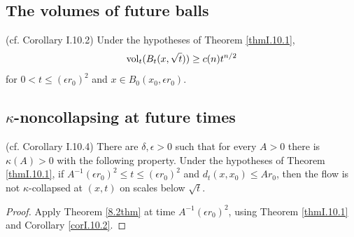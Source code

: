 \subsection{The volumes of future balls}
\begin{corollary}
  \label{cor:kl-volumes-future-balls-volume-corollary}
  (cf. Corollary I.10.2) \label{corI.10.2}
Under the hypotheses of Theorem \ref{thmI.10.1},
\begin{equation}\operatorname{vol}_t(B_t(x,\sqrt t))\ge c(n)t^{n/2}\end{equation}
for $0<t\le(\epsilon r_0)^2$ and $x\in B_0(x_0,\epsilon r_0)$.
\end{corollary}

\subsection{$\kappa$-noncollapsing at future times}
\begin{corollary}
  \label{cor:kl-noncollapsing-at-future-times-existence-kappa-solutions}
  (cf. Corollary I.10.4)
There are $\delta,\epsilon>0$ such that for every $A>0$ there is $\kappa(A)>0$ with
the following property. Under the hypotheses of Theorem \ref{thmI.10.1}, if
$A^{-1}(\epsilon r_0)^2\le t\le(\epsilon r_0)^2$ and $d_t(x,x_0)\le Ar_0$,
then the flow is not $\kappa$-collapsed at $(x,t)$ on scales below $\sqrt t$.
\end{corollary}
\begin{proof}
Apply Theorem \ref{8.2thm} at time $A^{-1}(\epsilon r_0)^2$, using Theorem
\ref{thmI.10.1} and Corollary \ref{corI.10.2}.
\end{proof}

